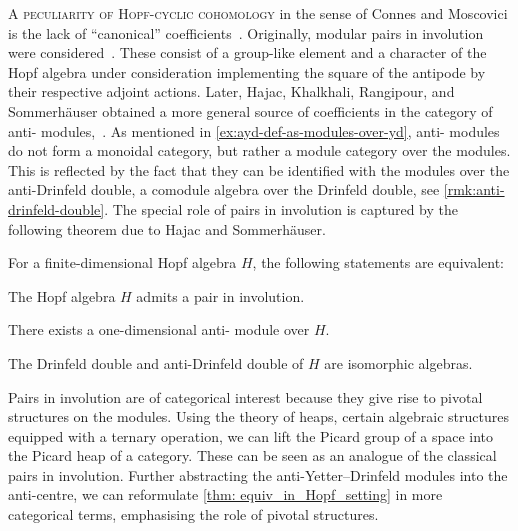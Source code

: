 \textsc{A peculiarity of Hopf-cyclic cohomology} in the sense of Connes and Moscovici
is the lack of ``canonical'' coefficients~\cite{Connes1999}.
Originally, modular pairs in involution were considered~\cite{Connes2000}.
These consist of a group-like element and a character
of the Hopf algebra under consideration
implementing the square of the antipode by their respective adjoint actions.
Later, Hajac, Khalkhali, Rangipour, and Sommerhäuser obtained a more general source of coefficients
in the category of anti\hyp{}\YetterDrinfeld{} modules,~\cite{Hajac2004a}.
As mentioned in \cref{ex:ayd-def-as-modules-over-yd},
anti\hyp{}\YetterDrinfeld{} modules do not form a monoidal category,
but rather a module category over the \YetterDrinfeld{} modules.
This is reflected by the fact that they can be identified with the modules over the anti\hyp{}Drinfeld double,
a comodule algebra over the Drinfeld double,
see \cref{rmk:anti-drinfeld-double}.
The special role of pairs in involution is captured by the following theorem due to Hajac and Sommerhäuser.

\begin{theorem}\label{thm: equiv_in_Hopf_setting}
  For a finite\hyp{}dimensional Hopf algebra \(H\), the following statements are equivalent:
  \begin{thmlist}[noitemsep]
    \item The Hopf algebra \(H\) admits a pair in involution.
    \item There exists a one-dimensional anti\hyp{}\YetterDrinfeld{} module over \(H\).
    \item The Drinfeld double and anti\hyp{}Drinfeld double of \(H\) are isomorphic algebras.
  \end{thmlist}
\end{theorem}

Pairs in involution are of categorical interest because they give rise to pivotal structures on the \YetterDrinfeld{} modules.
Using the theory of heaps,
certain algebraic structures equipped with a ternary operation,
we can lift the Picard group of a space into the Picard heap of a category.
These can be seen as an analogue of the classical pairs in involution.
Further abstracting the anti\hyp{}Yetter–Drinfeld modules into the anti\hyp{}centre,
we can reformulate \cref{thm: equiv_in_Hopf_setting} in more categorical terms,
emphasising the role of pivotal structures.

